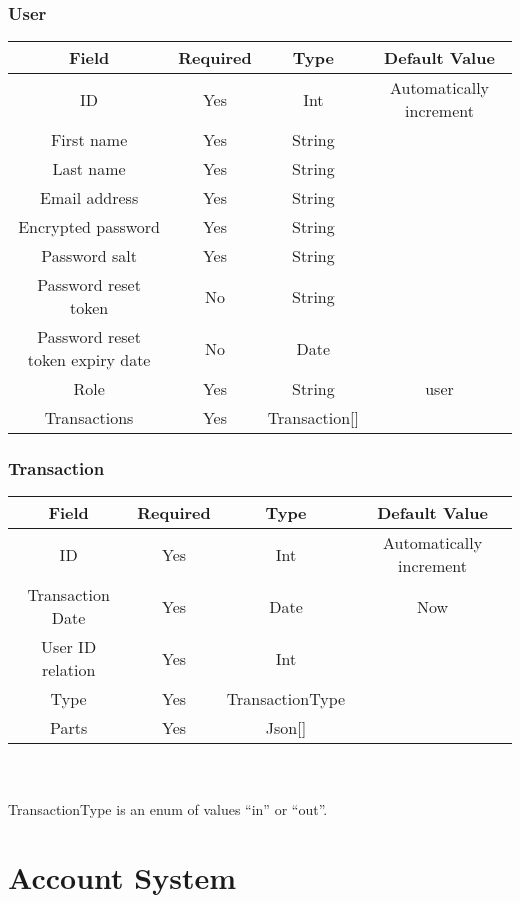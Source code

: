 \documentclass[12pt, letterpaper]{article}
\begin{document}
\subsubsection{User}

\begin{tabular}{cccc}
    \toprule
    \textbf{Field} & \textbf{Required} & \textbf{Type} & \textbf{Default Value} \\
    \midrule
    ID & Yes & Int & Automatically increment \\
    \midrule
    First name & Yes & String \\
    \midrule
    Last name & Yes & String \\
    \midrule
    Email address & Yes & String \\
    \midrule
    Encrypted password & Yes & String \\
    \midrule
    Password salt & Yes & String \\
    \midrule
    Password reset token & No & String \\
    \midrule
    Password reset token expiry date & No & Date \\
    \midrule
    Role & Yes & String & user \\
    \midrule
    Transactions & Yes & Transaction[] \\
    \bottomrule
\end{tabular}

\subsubsection{Transaction}

\begin{tabular}{cccc}
    \toprule
    \textbf{Field} & \textbf{Required} & \textbf{Type} & \textbf{Default Value} \\
    \midrule
    ID & Yes & Int & Automatically increment \\
    \midrule
    Transaction Date & Yes & Date & Now \\
    \midrule
    User ID relation & Yes & Int \\
    \midrule
    Type & Yes & TransactionType \\
    \midrule
    Parts & Yes & Json[] \\
    \bottomrule
\end{tabular}
\\\\
TransactionType is an enum of values ``in'' or ``out''.

\section{Account System}
\end{document}

